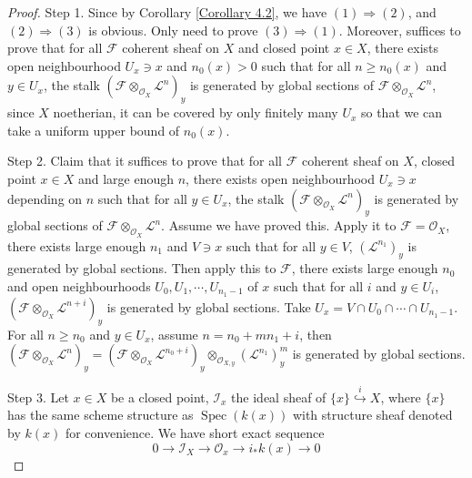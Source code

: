 \documentclass{ctexart}
\newcommand{\spec}{\operatorname{Spec}}
\begin{document}
\begin{proof}
    Step 1.
    Since by Corollary \ref{Corollary 4.2}, we have $(1) \Rightarrow (2)$, and $(2) \Rightarrow (3)$ is obvious.
    Only need to prove $(3) \Rightarrow (1)$.
    Moreover, suffices to prove that for all $\mathcal{F}$ coherent sheaf on $X$ and closed point $x\in X$,
    there exists open neighbourhood $U_{x}\ni x$ and $n_{0}(x) > 0$ such that for all $n \ge n_{0}(x)$ and $y\in U_{x}$,
    the stalk $(\mathcal{F} \otimes_{\mathcal{O}_{X}} \mathcal{L}^{n})_{y}$ is generated by global sections of $\mathcal{F} \otimes_{\mathcal{O}_{X}} \mathcal{L}^{n}$,
    since $X$ noetherian, it can be covered by only finitely many $U_{x}$ so that we can take a uniform upper bound of $n_{0}(x)$.
    \par
    Step 2.
    Claim that it suffices to prove that for all $\mathcal{F}$ coherent sheaf on $X$, closed point $x\in X$ and large enough $n$,
    there exists open neighbourhood $U_{x}\ni x$ depending on $n$ such that for all  $y\in U_{x}$,
    the stalk $(\mathcal{F} \otimes_{\mathcal{O}_{X}} \mathcal{L}^{n})_{y}$ is generated by global sections of $\mathcal{F} \otimes_{\mathcal{O}_{X}} \mathcal{L}^{n}$.
    Assume we have proved this.
    Apply it to $\mathcal{F} = \mathcal{O}_{X}$, there exists large enough $n_{1}$ and $V\ni x$ such that for all $y\in V$, $(\mathcal{L}^{n_{1}})_{y}$ is generated by global sections.
    Then apply this to $\mathcal{F}$, there exists large enough $n_{0}$ and open neighbourhoods $U_{0}, U_{1}, \cdots, U_{n_{1} - 1}$ of $x$ such that for all $i$ and $y\in U_{i}$,
    $(\mathcal{F} \otimes_{\mathcal{O}_{X}} \mathcal{L}^{n + i})_{y}$ is generated by global sections.
    Take $U_{x} = V \cap U_{0} \cap \cdots \cap U_{n_{1} - 1}$.
    For all $n \ge n_{0}$ and $y\in U_{x}$, assume $n = n_{0} + mn_{1} + i$, 
    then $(\mathcal{F} \otimes_{\mathcal{O}_{X}} \mathcal{L}^{n})_{y} = (\mathcal{F} \otimes_{\mathcal{O}_{X}} \mathcal{L}^{n_{0} + i})_{y} \otimes_{\mathcal{O}_{X, y}} (\mathcal{L}^{n_{1}})_{y}^{m}$ is generated by global sections.
    \par
    Step 3.
    Let $x\in X$ be a closed point, $\mathcal{I}_{x}$ the ideal sheaf of $\{x\} \overset{i}{\hookrightarrow} X$,
    where $\{x\}$ has the same scheme structure as $\spec(k(x))$ with structure sheaf denoted by $k(x)$ for convenience.
    We have short exact sequence
    \begin{equation}
        0 \longrightarrow \mathcal{I}_{X} \longrightarrow \mathcal{O}_{x} \longrightarrow i_{\ast}k(x) \longrightarrow 0
    \end{equation}

\end{proof}
\end{document}
